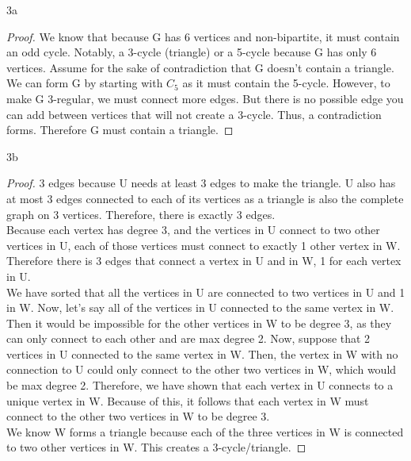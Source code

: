 \documentclass[boxes]{rutgers_hw}
\begin{document}
  \begin{exern}{3a}
    
  \end{exern}
  \begin{proof}
    We know that because G has 6 vertices and non-bipartite, it must contain an odd cycle. 
    Notably, a 3-cycle (triangle) or a 5-cycle because G has only 6 vertices. 
    Assume for the sake of contradiction that G doesn't contain a triangle. 
    We can form G by starting with $C_5$ as it must contain the 5-cycle.  
    However, to make G 3-regular, we must connect more edges. 
    But there is no possible edge you can add between vertices that will not create a 3-cycle.
    Thus, a contradiction forms. Therefore G must contain a triangle.
  \end{proof}

  \begin{exern}{3b}
    
  \end{exern}
  \begin{proof}
    3 edges because U needs at least 3 edges to make the triangle. U also has at most 3 edges connected to each of its vertices as a triangle is also the complete graph on 3 vertices. Therefore, there is exactly 3 edges. \\
    Because each vertex has degree 3, and the vertices in U connect to two other vertices in U, each of those vertices must connect to exactly 1 other vertex in W. Therefore there is 3 edges that connect a vertex in U and in W, 1 for each vertex in U. \\
    We have sorted that all the vertices in U are connected to two vertices in U and 1 in W. Now, let's say all of the vertices in U connected to the same vertex in W. 
    Then it would be impossible for the other vertices in W to be degree 3, as they can only connect to each other and are max degree 2.
    Now, suppose that 2 vertices in U connected to the same vertex in W.
    Then, the vertex in W with no connection to U could only connect to the other two vertices in W, which would be max degree 2.
    Therefore, we have shown that each vertex in U connects to a unique vertex in W. 
    Because of this, it follows that each vertex in W must connect to the other two vertices in W to be degree 3. \\
    We know W forms a triangle because each of the three vertices in W is connected to two other vertices in W. 
    This creates a 3-cycle/triangle.
  \end{proof}
\end{document}
